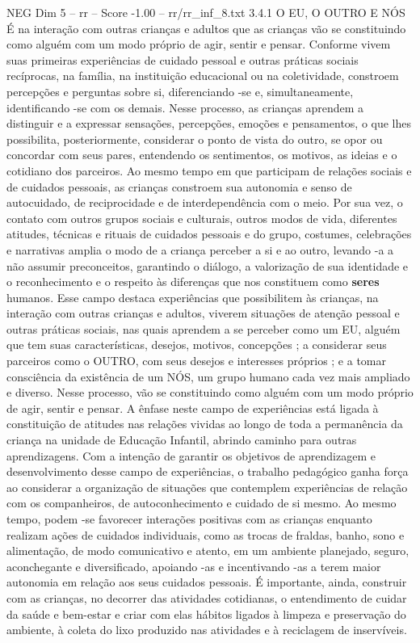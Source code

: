 \begin{textsample}{NEG Dim 5 – rr – Score -1.00 – rr/rr\_inf\_8.txt}  \label{ex:f5_neg_065}
3.4.1 O EU, O OUTRO E NÓS É na interação com outras crianças e adultos que as crianças vão se constituindo como alguém com um modo próprio de agir, sentir e pensar.
Conforme vivem suas primeiras experiências de cuidado pessoal e outras práticas sociais recíprocas, na família, na instituição educacional ou na coletividade, constroem percepções e perguntas sobre si, diferenciando -se e, simultaneamente, identificando -se com os demais.
Nesse processo, as crianças aprendem a distinguir e a expressar sensações, percepções, emoções e pensamentos, o que lhes possibilita, posteriormente, considerar o ponto de vista do outro, se opor ou concordar com seus pares, entendendo os sentimentos, os motivos, as ideias e o cotidiano dos parceiros.
Ao mesmo tempo em que participam de relações sociais e de cuidados pessoais, as crianças constroem sua autonomia e senso de autocuidado, de reciprocidade e de interdependência com o meio.
Por sua vez, o contato com outros grupos sociais e culturais, outros modos de vida, diferentes atitudes, técnicas e rituais de cuidados pessoais e do grupo, costumes, celebrações e narrativas amplia o modo de a criança perceber a si e ao outro, levando -a a não assumir preconceitos, garantindo o diálogo, a valorização de sua identidade e o reconhecimento e o respeito às diferenças que nos constituem como \textbf{seres} humanos.
Esse campo destaca experiências que possibilitem às crianças, na interação com outras crianças e adultos, viverem situações de atenção pessoal e outras práticas sociais, nas quais aprendem a se perceber como um EU, alguém que tem suas características, desejos, motivos, concepções ; a considerar seus parceiros como o OUTRO, com seus desejos e interesses próprios ; e a tomar consciência da existência de um NÓS, um grupo humano cada vez mais ampliado e diverso.
Nesse processo, vão se constituindo como alguém com um modo próprio de agir, sentir e pensar.
A ênfase neste campo de experiências está ligada à constituição de atitudes nas relações vividas ao longo de toda a permanência da criança na unidade de Educação Infantil, abrindo caminho para outras aprendizagens.
Com a intenção de garantir os objetivos de aprendizagem e desenvolvimento desse campo de experiências, o trabalho pedagógico ganha força ao considerar a organização de situações que contemplem experiências de relação com os companheiros, de autoconhecimento e cuidado de si mesmo.
Ao mesmo tempo, podem -se favorecer interações positivas com as crianças enquanto realizam ações de cuidados individuais, como as trocas de fraldas, banho, sono e alimentação, de modo comunicativo e atento, em um ambiente planejado, seguro, aconchegante e diversificado, apoiando -as e incentivando -as a terem maior autonomia em relação aos seus cuidados pessoais.
É importante, ainda, construir com as crianças, no decorrer das atividades cotidianas, o entendimento de cuidar da saúde e bem-estar e criar com elas hábitos ligados à limpeza e preservação do ambiente, à coleta do lixo produzido nas atividades e à reciclagem de inservíveis.

\end{textsample}
